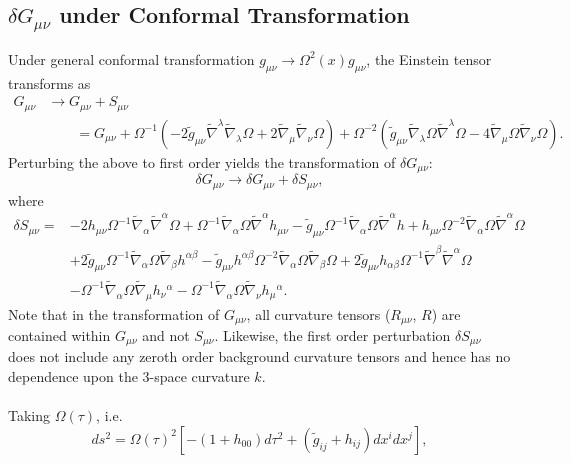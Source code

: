 \documentclass[10pt,letterpaper]{article}
\numberwithin{equation}{section}
\begin{document}
\subsection{$\delta G_{\mu\nu}$ under Conformal Transformation}
Under general conformal transformation $g_{\mu\nu}\to \Omega^2(x)g_{\mu\nu}$, the  Einstein tensor transforms as
\begin{align}
G_{\mu\nu} &\to G_{\mu\nu} + S_{\mu\nu}
\nonumber\\
&\qquad= G_{\mu\nu} +
\Omega^{-1}\left( -2\tilde g_{\mu\nu}\tilde\nabla^\lambda \tilde\nabla_\lambda \Omega + 2\tilde\nabla_\mu \tilde\nabla_\nu \Omega\right) +
\Omega^{-2}\left( \tilde g_{\mu\nu} \tilde\nabla_\lambda \Omega \tilde\nabla^\lambda \Omega - 4 \tilde\nabla_\mu \Omega \tilde\nabla_\nu \Omega\right).
\end{align}
Perturbing the above to first order yields the transformation of $\delta G_{\mu\nu}$:
\begin{equation}
\delta G_{\mu\nu} \to \delta G_{\mu\nu} + \delta S_{\mu\nu},
\end{equation}
where
\begin{align}
\delta S_{\mu\nu}={}&-2 h_{\mu \nu} \Omega^{-1} \tilde\nabla_{\alpha}\tilde\nabla^{\alpha}\Omega
 + \Omega^{-1} \tilde\nabla_{\alpha}\Omega \tilde\nabla^{\alpha}h_{\mu \nu}
 -  \tilde g_{\mu \nu} \Omega^{-1} \tilde\nabla_{\alpha}\Omega \tilde\nabla^{\alpha}h
 + h_{\mu \nu} \Omega^{-2} \tilde\nabla_{\alpha}\Omega \tilde\nabla^{\alpha}\Omega\nonumber\\
& + 2 \tilde g_{\mu \nu} \Omega^{-1} \tilde\nabla_{\alpha}\Omega \tilde\nabla_{\beta}h^{\alpha \beta}
 -  \tilde g_{\mu \nu} h^{\alpha \beta} \Omega^{-2} \tilde\nabla_{\alpha}\Omega \tilde\nabla_{\beta}\Omega
 + 2 \tilde g_{\mu \nu} h_{\alpha \beta} \Omega^{-1} \tilde\nabla^{\beta}\tilde\nabla^{\alpha}\Omega\nonumber\\
& -  \Omega^{-1} \tilde\nabla_{\alpha}\Omega \tilde\nabla_{\mu}h_{\nu}{}^{\alpha}
 -  \Omega^{-1} \tilde\nabla_{\alpha}\Omega \tilde\nabla_{\nu}h_{\mu}{}^{\alpha}.
\end{align}
Note that in the transformation of $G_{\mu\nu}$, all curvature tensors ($R_{\mu\nu}$, $R$) are contained within $G_{\mu\nu}$ and not $S_{\mu\nu}$. Likewise, the first order perturbation $\delta S_{\mu\nu}$ does not include any zeroth order background curvature tensors and hence has no dependence upon the 3-space curvature $k$.
\\ \\
Taking $\Omega(\tau)$, i.e.
\begin{equation}
ds^2 = \Omega(\tau)^2\left[ -(1+h_{00})d\tau^2 + (\tilde g_{ij}+h_{ij})dx^i dx^j\right],
\end{equation}
\end{document}
